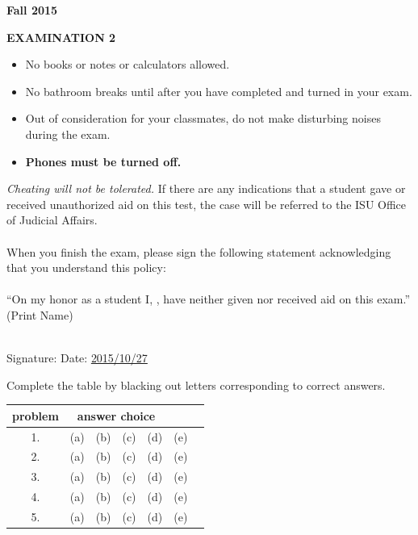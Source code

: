 \documentclass[fleqn,12pt]{article}
\newcommand{\<}{\ensuremath{\langle}}
\renewcommand{\>}{\ensuremath{\rangle}}
\begin{document}
\pagestyle{empty}
{}
\hfill {\bf Fall 2015}
\begin{center}
{\bf EXAMINATION 2}
\thispagestyle{empty}
\end{center}
\vskip1cm
\begin{itemize}
\item No books or notes or calculators allowed.
\item No bathroom breaks until after you have completed and turned in your exam.
\item Out of consideration for your classmates, do not make
disturbing noises during the exam.
\item {\bf Phones must be turned off.}
\end{itemize}
\vskip1cm
{\it Cheating will not be tolerated.}  If there are any indications that a
  student gave or received unauthorized aid on this test, the case 
  will be referred to the ISU Office of Judicial Affairs.%
\\\\
When you finish the exam, please sign the following statement acknowledging that
you understand  this policy:\\
\\
``On my honor as a student I,
\underline{\phantom{XXXXXXXXXXXXXXXX}}, have neither
given nor received aid on this exam.''
\hbox{} \hskip 1.5in {\small (Print Name)}\\
\\
\begin{flushright} Signature: \underline{\phantom{XXXXXXXXXXXXXXXXXXXXXXXX}}
  Date: \underline{\phantom{XXX}2015/10/27\phantom{XXX}}
\end{flushright}


\newpage

Complete the table by blacking out letters corresponding to correct answers.
  
  \begin{center}
    \begin{tabular}{|c|c|c|c|c|c|c|}
      \hline
      {\bf problem} & \multicolumn{4}{c}{{\bf answer choice}}&\\[4pt]
      \hline
      1. & (a) & (b) & (c) & (d) & (e) \\[4pt]
      \hline
      2. & (a) & (b) & (c) & (d) & (e) \\[4pt]
      \hline
      3. & (a) & (b) & (c) & (d) & (e) \\[4pt]
      \hline
      4. & (a) & (b) & (c) & (d) & (e) \\[4pt]
      \hline
      5. & (a) & (b) & (c) & (d) & (e) \\[4pt]
      \hline
    \end{tabular}
  \end{center}
\end{document}
